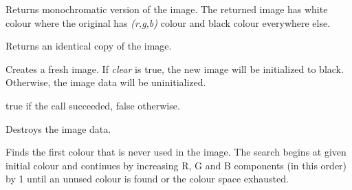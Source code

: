 \label{wxbitmapconverttomono}


Returns monochromatic version of the image. The returned image has white
colour where the original has {\it (r,g,b)} colour and black colour
everywhere else.


\label{wximagecopy}


Returns an identical copy of the image.


\label{wximagecreate}


Creates a fresh image.  If {\it clear} is true, the new image will be initialized to black.
Otherwise, the image data will be uninitialized.





true if the call succeeded, false otherwise.


\label{wximagedestroy}


Destroys the image data.


\label{wximagefindfirstunusedcolour}





Finds the first colour that is never used in the image. The search begins at
given initial colour and continues by increasing R, G and B components (in this
order) by 1 until an unused colour is found or the colour space exhausted.

